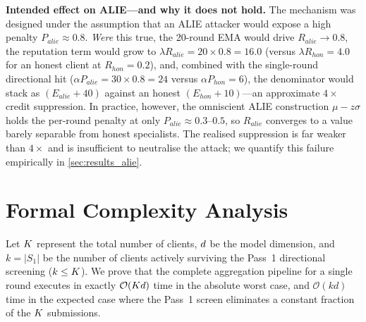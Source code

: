 \documentclass[../main.tex]{subfiles}
\begin{document}
\textbf{Intended effect on ALIE---and why it does not hold.} The mechanism was designed under the assumption that an ALIE attacker would expose a high penalty $P_{alie} \approx 0.8$. \emph{Were} this true, the 20-round EMA would drive $R_{alie} \to 0.8$, the reputation term would grow to $\lambda R_{alie} = 20 \times 0.8 = 16.0$ (versus $\lambda R_{hon} = 4.0$ for an honest client at $R_{hon} = 0.2$), and, combined with the single-round directional hit ($\alpha P_{alie} = 30 \times 0.8 = 24$ versus $\alpha P_{hon} = 6$), the denominator would stack as $(E_{alie} + 40)$ against an honest $(E_{hon} + 10)$---an approximate $4\times$ credit suppression. In practice, however, the omniscient ALIE construction $\mu - z\sigma$ holds the per-round penalty at only $P_{alie} \approx 0.3$--$0.5$, so $R_{alie}$ converges to a value barely separable from honest specialists. The realised suppression is far weaker than $4\times$ and is insufficient to neutralise the attack; we quantify this failure empirically in \cref{sec:results_alie}.

\section{Formal Complexity Analysis}
\label{sec:aegis_complexity}

\begin{theorem}
\label{thm:complexity}
Let $K$ represent the total number of clients, $d$ be the model dimension, and $k = |S_1|$ be the number of clients actively surviving the Pass~1 directional screening ($k \leq K$). We prove that the complete \aegis{} aggregation pipeline for a single round executes in exactly $\mathcal{O}(K d)$ time in the absolute worst case, and $\mathcal{O}(kd)$ time in the expected case where the Pass~1 screen eliminates a constant fraction of the $K$ submissions.
\end{theorem}
\end{document}

